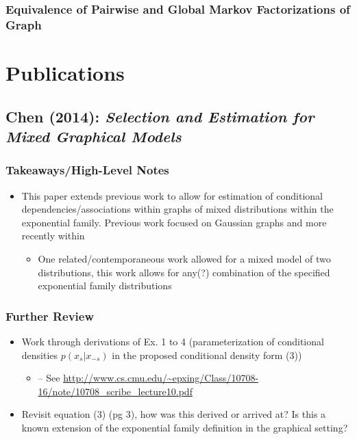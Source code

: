 \documentclass[11pt]{article}
\begin{document}
\subsection*{Equivalence of Pairwise and Global Markov Factorizations of Graph}


\newpage 

\begin{tcolorbox}
\vspace{4mm}
\bf \LARGE \chapter{Publications}
\vspace{4mm}
\end{tcolorbox}

\section*{Chen (2014): {\large \it Selection and Estimation for Mixed Graphical Models}}

\subsection*{Takeaways/High-Level Notes}
	\begin{itemize}
		\item This paper extends previous work to allow for estimation of conditional dependencies/associations within graphs of mixed distributions within the exponential family. Previous work focused on Gaussian graphs and more recently within 
		\begin{itemize}
			\item One related/contemporaneous work allowed for a mixed model of two distributions, this work allows for any(?) combination of the specified exponential family distributions
        \end{itemize}
	\end{itemize}

\subsection*{Further Review}
	
	\begin{itemize}
		\item Work through derivations of Ex. 1 to 4 (parameterization of conditional densities $p(x_s | x_{-s})$ in the proposed conditional density form (3))
        \begin{itemize}
            \item -- See \url{http://www.cs.cmu.edu/~epxing/Class/10708-16/note/10708_scribe_lecture10.pdf}
        \end{itemize}
        \item Revisit equation (3) (pg 3), how was this derived or arrived at? Is this a known extension of the exponential family definition in the graphical setting? 
	\end{itemize}
\end{document}

